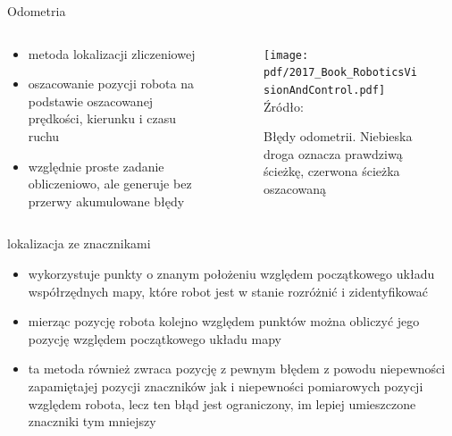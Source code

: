 \begin{frame}
{Odometria}
	\begin{columns}
		\begin{column}{0.45\textwidth}
			\begin{itemize}
				\item metoda lokalizacji zliczeniowej
				\item oszacowanie pozycji robota na podstawie oszacowanej prędkości, kierunku i czasu ruchu
				\item względnie proste zadanie obliczeniowo, ale generuje bez przerwy akumulowane błędy
			\end{itemize}
		\end{column}
		\begin{column}{0.55\textwidth}  %
			\begin{figure}
				\begin{center}
					\texttt{[image: pdf/2017\_Book\_RoboticsVisionAndControl.pdf]}
					\hspace*{15pt}\hbox{\scriptsize{Źródło:}}
					\caption{Błędy odometrii. Niebieska droga oznacza prawdziwą ścieżkę, czerwona ścieżka oszacowaną }
				\end{center}
			\end{figure}
		\end{column}
	\end{columns}
\end{frame}

\begin{frame}
{lokalizacja ze znacznikami}
	\begin{itemize}
		\item wykorzystuje punkty o znanym położeniu względem początkowego układu współrzędnych mapy, które robot jest w stanie rozróżnić i zidentyfikować
		\item mierząc pozycję robota kolejno względem punktów można obliczyć jego pozycję względem początkowego układu mapy
		\item ta metoda również zwraca pozycję z pewnym błędem z powodu niepewności zapamiętajej pozycji znaczników jak i niepewności pomiarowych pozycji względem robota, lecz ten błąd jest ograniczony, im lepiej umieszczone znaczniki tym mniejszy
	\end{itemize}
\end{frame}

